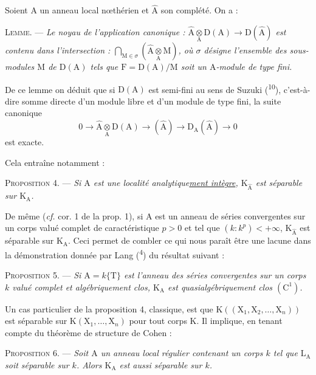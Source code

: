 
Soient $\mathrm A$ un anneau local nœthérien et $\widehat{\mathrm A}$ son complété. On a :

\textsc{Lemme.} --- \textit{Le noyau de l’application canonique : $\widehat{\mathrm A}\underset{\mathrm A}{\otimes}\mathrm D(\mathrm A)\to\mathrm D(\widehat{\mathrm A})$ est contenu dans l’intersection : $\displaystyle\bigcap_{\mathrm M\in\sigma}\left(\widehat{\mathrm A}\underset{\mathrm A}{\otimes}\mathrm M\right)$, où $\sigma$ désigne l’ensemble des sous-modules $\mathrm M$ de $\mathrm D(\mathrm A)$ tels que $\mathrm F=\mathrm D(\mathrm A)/\mathrm M$ soit un $\mathrm A$-module de type fini.}

De ce lemme on déduit que si $\mathrm D(\mathrm A)$ est semi-fini au sens de Suzuki (\textsuperscript{10}), c’est-à-dire somme directe d’un module libre et d’un module de type fini, la suite canonique
\[
0\to\widehat{\mathrm A}\underset{\mathrm A}{\otimes}\mathrm D(\mathrm A)\to(\widehat{\mathrm A})\to\mathrm D_{\mathrm A}(\widehat{\mathrm A})\to0
\]
est exacte.

Cela entraîne notamment :

\textsc{Proposition 4.} --- \textit{Si $\mathrm A$ est une localité analytique\uline{ment intègre}, $\mathrm K_{\widehat{\mathrm A}}$ est séparable sur $\mathrm K_{\mathrm A}$.}

De même (\textit{cf.} cor. 1 de la prop. 1), si $\mathrm A$ est un anneau de séries convergentes sur un corps valué complet de caractéristique $p>0$ et tel que $(k:k^p)<+\infty$, $\mathrm K_{\widehat{\mathrm A}}$ est séparable sur $\mathrm K_{\mathrm A}$. Ceci permet de combler ce qui nous paraît être une lacune dans la démonstration donnée par Lang (\textsuperscript{4}) du résultat suivant :
\margin{\handwritten{$\left.\rule{0pt}{8em}\right]$ connu}}

\textsc{Proposition 5.} --- \textit{Si $\mathrm A=k\{\mathrm T\}$ est l’anneau des séries convergentes sur un corps $k$ valué complet et algébriquement clos, $\mathrm K_{\mathrm A}$ est quasialgébriquement clos $(\mathrm C^1)$.}

Un cas particulier de la proposition 4, classique, est que $\mathrm K((\mathrm X_1,\mathrm X_2,\ldots,\mathrm X_n))$ est séparable sur $\mathrm K(\mathrm X_1,\ldots,\mathrm X_n)$ pour tout corps $\mathrm K$. Il implique, en tenant compte du théorème de structure de Cohen :

\textsc{Proposition 6.} --- \textit{Soit $\mathrm A$ un anneau local régulier contenant un corps $k$ tel que $\mathrm L_{\mathrm A}$ soit séparable sur $k$. Alors $\mathrm K_{\mathrm A}$ est aussi séparable sur $k$.}

